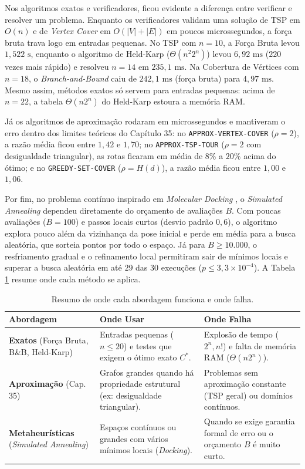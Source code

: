 \documentclass[conference]{IEEEtran}
\theoremstyle{definition}
\theoremstyle{plain}
\begin{document}
Nos algoritmos exatos e verificadores, ficou evidente a diferença entre verificar e resolver um problema. Enquanto os verificadores validam uma solução de TSP em $O(n)$ e de \textit{Vertex Cover} em $O(|V| + |E|)$ em poucos microssegundos, a força bruta trava logo em entradas pequenas. No TSP com $n = 10$, a Força Bruta levou $1{,}522\text{ s}$, enquanto o algoritmo de Held-Karp \cite{held1962dynamic} ($\Theta(n^2 2^n)$) levou $6{,}92\text{ ms}$ ($220$ vezes mais rápido) e resolveu $n = 14$ em $235{,}1\text{ ms}$. Na Cobertura de Vértices com $n = 18$, o \textit{Branch-and-Bound} caiu de $242{,}1\text{ ms}$ (força bruta) para $4{,}97\text{ ms}$. Mesmo assim, métodos exatos só servem para entradas pequenas: acima de $n = 22$, a tabela $\Theta(n 2^n)$ do Held-Karp estoura a memória RAM.

Já os algoritmos de aproximação rodaram em microssegundos e mantiveram o erro dentro dos limites teóricos do Capítulo 35: no \texttt{APPROX-VERTEX-COVER} ($\rho = 2$), a razão média ficou entre $1{,}42$ e $1{,}70$; no \texttt{APPROX-TSP-TOUR} ($\rho = 2$ com desigualdade triangular), as rotas ficaram em média de $8\%$ a $20\%$ acima do ótimo; e no \texttt{GREEDY-SET-COVER} ($\rho = H(d)$), a razão média ficou entre $1{,}00$ e $1{,}06$.

Por fim, no problema contínuo inspirado em \textit{Molecular Docking} \cite{pagadala2017software,huang2018comprehensive}, o \textit{Simulated Annealing} dependeu diretamente do orçamento de avaliações $B$. Com poucas avaliações ($B = 100$) e passos locais curtos (desvio padrão $0{,}6$), o algoritmo explora pouco além da vizinhança da pose inicial e perde em média para a busca aleatória, que sorteia pontos por todo o espaço. Já para $B \ge 10.000$, o resfriamento gradual e o refinamento local permitiram sair de mínimos locais e superar a busca aleatória em até $29$ das $30$ execuções ($p \le 3{,}3 \times 10^{-4}$). A Tabela \ref{tab:resumo_aplicabilidade} resume onde cada método se aplica.

\begin{table}[htbp]
\centering
\caption{Resumo de onde cada abordagem funciona e onde falha.}
\label{tab:resumo_aplicabilidade}
\footnotesize
\begin{tabular}{@{}p{2.0cm}p{3.0cm}p{3.0cm}@{}}
\toprule
\textbf{Abordagem} & \textbf{Onde Usar} & \textbf{Onde Falha} \\
\midrule
\textbf{Exatos} (Força Bruta, B\&B, Held-Karp) & Entradas pequenas ($n \le 20$) e testes que exigem o ótimo exato $C^*$. & Explosão de tempo ($2^n, n!$) e falta de memória RAM ($\Theta(n 2^n)$). \\[0.1cm]
\textbf{Aproximação} (Cap. 35) & Grafos grandes quando há propriedade estrutural (ex: desigualdade triangular). & Problemas sem aproximação constante (TSP geral) ou domínios contínuos. \\[0.1cm]
\textbf{Metaheurísticas} (\textit{Simulated Annealing}) & Espaços contínuos ou grandes com vários mínimos locais (\textit{Docking}). & Quando se exige garantia formal de erro ou o orçamento $B$ é muito curto. \\
\bottomrule
\end{tabular}
\end{table}
\end{document}

